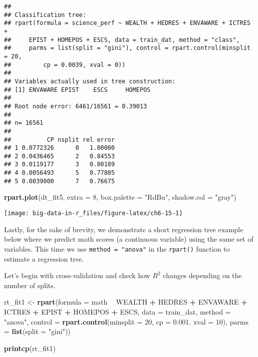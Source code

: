 \documentclass[]{book}
\newenvironment{Shaded}{\begin{snugshade}}{\end{snugshade}}
\newcommand{\DataTypeTok}[1]{\textcolor[rgb]{0.13,0.29,0.53}{#1}}
\newcommand{\DecValTok}[1]{\textcolor[rgb]{0.00,0.00,0.81}{#1}}
\newcommand{\FloatTok}[1]{\textcolor[rgb]{0.00,0.00,0.81}{#1}}
\newcommand{\KeywordTok}[1]{\textcolor[rgb]{0.13,0.29,0.53}{\textbf{#1}}}
\newcommand{\NormalTok}[1]{#1}
\newcommand{\OperatorTok}[1]{\textcolor[rgb]{0.81,0.36,0.00}{\textbf{#1}}}
\newcommand{\StringTok}[1]{\textcolor[rgb]{0.31,0.60,0.02}{#1}}
\begin{document}
\begin{verbatim}
## 
## Classification tree:
## rpart(formula = science_perf ~ WEALTH + HEDRES + ENVAWARE + ICTRES + 
##     EPIST + HOMEPOS + ESCS, data = train_dat, method = "class", 
##     parms = list(split = "gini"), control = rpart.control(minsplit = 20, 
##         cp = 0.0039, xval = 0))
## 
## Variables actually used in tree construction:
## [1] ENVAWARE EPIST    ESCS     HOMEPOS 
## 
## Root node error: 6461/16561 = 0.39013
## 
## n= 16561 
## 
##          CP nsplit rel error
## 1 0.0772326      0   1.00000
## 2 0.0436465      2   0.84553
## 3 0.0119177      3   0.80189
## 4 0.0056493      5   0.77805
## 5 0.0039000      7   0.76675
\end{verbatim}

\begin{Shaded}
\begin{Highlighting}[]
\KeywordTok{rpart.plot}\NormalTok{(dt_fit5, }\DataTypeTok{extra =} \DecValTok{8}\NormalTok{, }\DataTypeTok{box.palette =} \StringTok{"RdBu"}\NormalTok{, }\DataTypeTok{shadow.col =} \StringTok{"gray"}\NormalTok{)}
\end{Highlighting}
\end{Shaded}

\texttt{[image: big-data-in-r\_files/figure-latex/ch6-15-1]}

Lastly, for the sake of brevity, we demonstrate a short regression tree example below where we predict math scores (a continuous variable) using the same set of variables. This time we use \texttt{method\ =\ "anova"} in the \texttt{rpart()} function to estimate a regression tree.

Let's begin with cross-validation and check how \(R^2\) changes depending on the number of splits.

\begin{Shaded}
\begin{Highlighting}[]
\NormalTok{rt_fit1 <-}\StringTok{ }\KeywordTok{rpart}\NormalTok{(}\DataTypeTok{formula =}\NormalTok{ math }\OperatorTok{~}\StringTok{ }\NormalTok{WEALTH }\OperatorTok{+}\StringTok{ }\NormalTok{HEDRES }\OperatorTok{+}\StringTok{ }\NormalTok{ENVAWARE }\OperatorTok{+}\StringTok{ }
\StringTok{                  }\NormalTok{ICTRES }\OperatorTok{+}\StringTok{ }\NormalTok{EPIST }\OperatorTok{+}\StringTok{ }\NormalTok{HOMEPOS }\OperatorTok{+}\StringTok{ }\NormalTok{ESCS,}
                 \DataTypeTok{data =}\NormalTok{ train_dat,}
                 \DataTypeTok{method =} \StringTok{"anova"}\NormalTok{, }
                 \DataTypeTok{control =} \KeywordTok{rpart.control}\NormalTok{(}\DataTypeTok{minsplit =} \DecValTok{20}\NormalTok{,}
                                         \DataTypeTok{cp =} \FloatTok{0.001}\NormalTok{,}
                                         \DataTypeTok{xval =} \DecValTok{10}\NormalTok{),}
                \DataTypeTok{parms =} \KeywordTok{list}\NormalTok{(}\DataTypeTok{split =} \StringTok{"gini"}\NormalTok{))}

\KeywordTok{printcp}\NormalTok{(rt_fit1)}
\end{Highlighting}
\end{Shaded}
\end{document}
